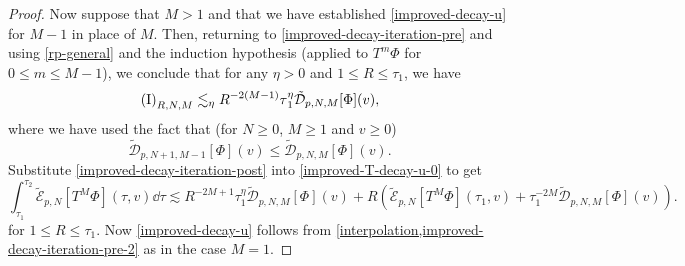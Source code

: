 \documentclass[10pt, reqno]{amsart}
\begin{document}
\begin{proof}
Now suppose that \(M>1\) and that we have established \cref{improved-decay-u} for
\(M-1\) in place of \(M\). Then, returning to \cref{improved-decay-iteration-pre}
and using \cref{rp-general} and the induction hypothesis (applied to \(T^m\Phi{}\)
for \(0\le m\le M-1\)), we conclude that for any \(\eta{}>0\) and \(1\le R\le \tau{}_1\), we have
\begin{equation}\label{improved-decay-iteration-post}
\begin{split}
\textnormal{(I)}_{R,N,M} \lesssim_\eta{} R^{-2(M-1)}\tau{}_1^\eta{}\tilde{\mathcal{D}}_{p,N,M}[\Phi{}](v),
\end{split}
\end{equation}
where we have used the fact that (for \(N\ge 0\), \(M\ge 1\) and \(v\ge
0\))
\begin{equation}\label{data-tilde-facts}
\tilde{\mathcal{D}}_{p,N+1,M-1}[\Phi{}](v)\le \tilde{\mathcal{D}}_{p,N,M}[\Phi{}](v).
\end{equation}
Substitute \cref{improved-decay-iteration-post} into \cref{improved-T-decay-u-0} to
get
\begin{equation}\label{improved-decay-iteration-pre-2}
\int_{\tau{}_1}^{\tau{}_2} \tilde{\mathcal{E}}_{p,N}[T^M\Phi{}](\tau{},v)\dd{}\tau{}\lesssim R^{-2M+1}\tau{}_1^\eta{}\tilde{\mathcal{D}}_{p,N,M}[\Phi{}](v) + R(\tilde{\mathcal{E}}_{p,N}[T^M\Phi{}](\tau{}_1,v) + \tau{}_1^{-2M} \tilde{\mathcal{D}}_{p,N,M}[\Phi{}](v)).
\end{equation}
for \(1\le R\le \tau{}_1\). Now \cref{improved-decay-u} follows from \cref{interpolation,improved-decay-iteration-pre-2} as in
the case \(M = 1\).
\end{proof}
\end{document}
